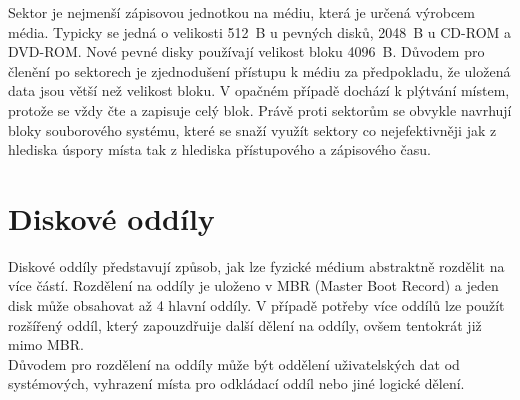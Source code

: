 Sektor je nejmenší zápisovou jednotkou na médiu, která je určená výrobcem média. Typicky se jedná o velikosti 512~B u pevných disků, 2048~B u CD-ROM a DVD-ROM. Nové pevné disky používají velikost bloku 4096~B. Důvodem pro členění po sektorech je zjednodušení přístupu k médiu za předpokladu, že uložená data jsou větší než velikost bloku. V opačném případě dochází k plýtvání místem, protože se vždy čte a zapisuje celý blok. Právě proti sektorům se obvykle navrhují bloky souborového systému, které se snaží využít sektory co nejefektivněji jak z hlediska úspory místa tak z hlediska přístupového a zápisového času.\\

\section{Diskové oddíly}
Diskové oddíly představují způsob, jak lze fyzické médium abstraktně rozdělit na více částí. Rozdělení na oddíly je uloženo v MBR (Master Boot Record) a jeden disk může obsahovat až 4 hlavní oddíly. V případě potřeby více oddílů lze použít rozšířený oddíl, který zapouzdřuije další dělení na oddíly, ovšem tentokrát již mimo MBR.\\
Důvodem pro rozdělení na oddíly může být oddělení uživatelských dat od systémových, vyhrazení místa pro odkládací oddíl nebo jiné logické dělení. 

